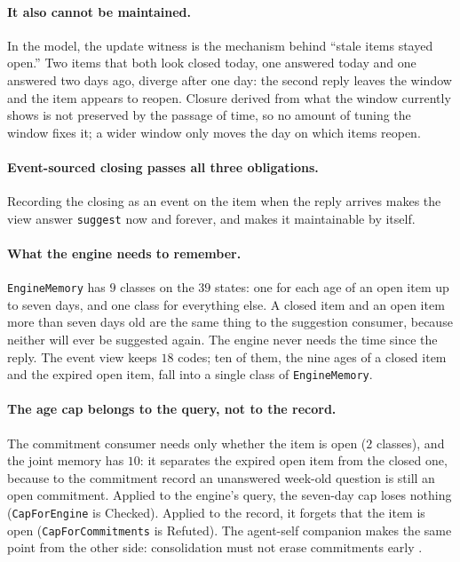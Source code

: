 \documentclass[11pt]{article}
\newcommand{\code}[1]{\texttt{#1}}
\theoremstyle{definition}
\theoremstyle{plain}
\begin{document}
\paragraph{It also cannot be maintained.} In the model, the update witness is the mechanism behind
``stale items stayed open.'' Two items that both look closed today, one answered today and one answered two days
ago, diverge after one day: the second reply leaves the window and the item appears to reopen.
Closure derived from what the window currently shows is not preserved by the passage of time, so
no amount of tuning the window fixes it; a wider window only moves the day on which items reopen.

\paragraph{Event-sourced closing passes all three obligations.} Recording the closing as an event
on the item when the reply arrives makes the view answer \code{suggest} now and forever, and makes
it maintainable by itself.

\paragraph{What the engine needs to remember.} \code{EngineMemory} has $9$ classes on the $39$
states: one for each age of an open item up to seven days, and one class for everything else. A
closed item and an open item more than seven days old are the same thing to the suggestion
consumer, because neither will ever be suggested again. The engine never needs the time since the
reply. The
event view keeps $18$ codes; ten of them, the nine ages of a closed item and the expired open item,
fall into a single class of \code{EngineMemory}.

\paragraph{The age cap belongs to the query, not to the record.} The commitment consumer needs only
whether the item is open ($2$ classes), and the joint memory has $10$: it separates the expired open
item from the closed one, because to the commitment record an unanswered week-old question is
still an open commitment. Applied to the engine's query, the seven-day cap loses nothing
(\code{CapForEngine} is Checked). Applied to the record, it forgets that the item is open
(\code{CapForCommitments} is Refuted). The agent-self companion makes the same point from the
other side: consolidation must not erase commitments early \cite{self2}.
\end{document}
